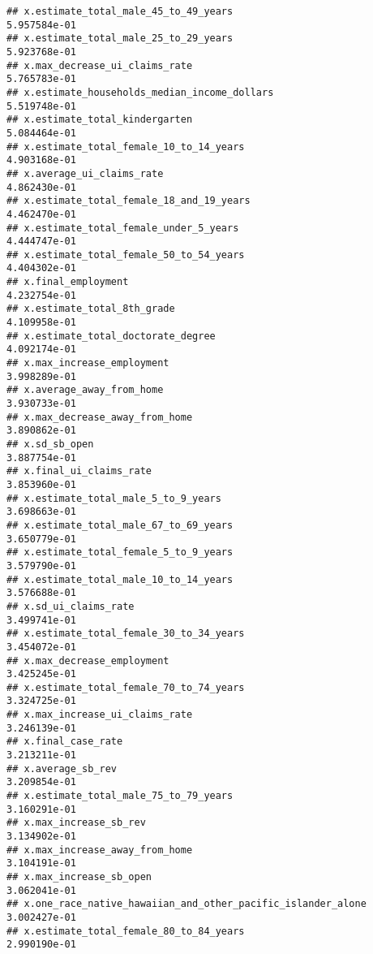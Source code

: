 \documentclass[
]{article}
\begin{document}
\begin{verbatim}
## x.estimate_total_male_45_to_49_years                        5.957584e-01
## x.estimate_total_male_25_to_29_years                        5.923768e-01
## x.max_decrease_ui_claims_rate                               5.765783e-01
## x.estimate_households_median_income_dollars                 5.519748e-01
## x.estimate_total_kindergarten                               5.084464e-01
## x.estimate_total_female_10_to_14_years                      4.903168e-01
## x.average_ui_claims_rate                                    4.862430e-01
## x.estimate_total_female_18_and_19_years                     4.462470e-01
## x.estimate_total_female_under_5_years                       4.444747e-01
## x.estimate_total_female_50_to_54_years                      4.404302e-01
## x.final_employment                                          4.232754e-01
## x.estimate_total_8th_grade                                  4.109958e-01
## x.estimate_total_doctorate_degree                           4.092174e-01
## x.max_increase_employment                                   3.998289e-01
## x.average_away_from_home                                    3.930733e-01
## x.max_decrease_away_from_home                               3.890862e-01
## x.sd_sb_open                                                3.887754e-01
## x.final_ui_claims_rate                                      3.853960e-01
## x.estimate_total_male_5_to_9_years                          3.698663e-01
## x.estimate_total_male_67_to_69_years                        3.650779e-01
## x.estimate_total_female_5_to_9_years                        3.579790e-01
## x.estimate_total_male_10_to_14_years                        3.576688e-01
## x.sd_ui_claims_rate                                         3.499741e-01
## x.estimate_total_female_30_to_34_years                      3.454072e-01
## x.max_decrease_employment                                   3.425245e-01
## x.estimate_total_female_70_to_74_years                      3.324725e-01
## x.max_increase_ui_claims_rate                               3.246139e-01
## x.final_case_rate                                           3.213211e-01
## x.average_sb_rev                                            3.209854e-01
## x.estimate_total_male_75_to_79_years                        3.160291e-01
## x.max_increase_sb_rev                                       3.134902e-01
## x.max_increase_away_from_home                               3.104191e-01
## x.max_increase_sb_open                                      3.062041e-01
## x.one_race_native_hawaiian_and_other_pacific_islander_alone 3.002427e-01
## x.estimate_total_female_80_to_84_years                      2.990190e-01

\end{verbatim}
\end{document}
